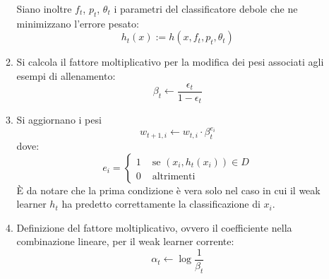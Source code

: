 \begin{enumerate}
\begin{enumerate}
                    Siano inoltre $f_t$, $p_t$, $\theta_t$ i parametri del classificatore debole che ne minimizzano l'errore pesato:
                    \begin{equation}
                        \label{subeq:best_weak_classifier}
                        h_t(x) := h(x, f_t, p_t, \theta_t)
                    \end{equation}

                    \item \label{adaboost_beta} 
                    Si calcola il fattore moltiplicativo per la modifica dei pesi associati agli esempi di allenamento:
                    \begin{equation}
                        \label{subeq:weight_factor_definition}
                        \beta_t \leftarrow \frac{\epsilon_t}{1 - \epsilon_t}
                    \end{equation}

                    \item \label{adaboost_update_weights} Si aggiornano i pesi
                    \begin{equation}
                        \label{subeq:weight_update}
                        w_{t+1, i} \leftarrow w_{t,i} \cdot \beta_{t}^{e_i}
                    \end{equation}
                    dove:
                    \begin{equation}
                        \label{subeq:weak_learner_classification}
                        e_i = 
                        \begin{cases}
                            1 & \text{ se } (x_i, h_t(x_i)) \in D\\
                            0 & \text{ altrimenti }
                        \end{cases}
                    \end{equation}
                    È da notare che la prima condizione è vera solo nel caso in cui il weak learner $h_t$ ha predetto correttamente la classificazione di $x_i$.

                    \item Definizione del fattore moltiplicativo, ovvero il coefficiente nella combinazione lineare, per il weak learner corrente:
                    \begin{equation}
                        \label{subeq:alpha_factor}
                        \alpha_t \leftarrow \log\frac{1}{\beta_t}
                    \end{equation}
                \end{enumerate}


\end{enumerate}

